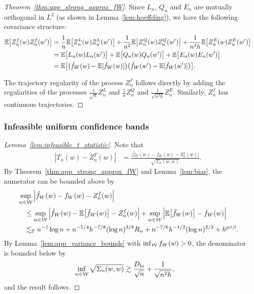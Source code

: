 \begin{proof}[Theorem~\ref{thm:app_strong_approx_fW}]
  Since $L_n$, $Q_n$ and $E_n$
  are mutually orthogonal in $L^2$
  (as shown in Lemma~\ref{lem:hoeffding}),
  we have the following covariance
  structure:
  \begin{align*}
    \mathbb{E}\big[Z_n^f(w) Z_n^f(w')\big]
    &=
    \frac{1}{n} \mathbb{E}\big[ Z_n^L(w) Z_n^L(w') \big]
    + \frac{1}{n^2} \mathbb{E}\big[ Z_n^Q(w) Z_n^Q(w') \big]
    + \frac{1}{n^2h} \mathbb{E}\big[ Z_n^E(w) Z_n^E(w') \big] \\
    &=
    \mathbb{E}\big[ L_n(w) L_n(w') \big]
    + \mathbb{E}\big[ Q_n(w) Q_n(w') \big]
    + \mathbb{E}\big[ E_n(w) E_n(w') \big] \\
    &=
    \mathbb{E}\big[
      \big(\hat f_W(w) - \mathbb{E}[\hat f_W(w)]\big)
      \big(\hat f_W(w') - \mathbb{E}[\hat f_W(w')]\big)
    \big].
  \end{align*}


  The trajectory regularity of the process
  $Z_n^f$ follows directly
  by adding the regularities
  of the processes $\frac{1}{\sqrt n} Z_n^L$
  and
  $\frac{1}{n} Z_n^Q$
  and
  $\frac{1}{\sqrt{n^2h}} Z_n^E$.
  Similarly, $Z_n^f$ has continuous trajectories.
\end{proof}

\subsubsection{Infeasible uniform confidence bands}

\begin{proof}[Lemma~\ref{lem:infeasible_t_statistic}]

  Note that
  \begin{align*}
    \left| T_n(w) - Z_n^T(w) \right|
    &= \frac{\big| \hat f_W(w) - f_W(w) - Z_n^f(w) \big|}
    {\sqrt{\Sigma_n(w,w)}}.
  \end{align*}
  By Theorem~\ref{thm:app_strong_approx_fW}
  and Lemma~\ref{lem:bias},
  the numerator can be bounded above by
  \begin{align*}
    &\sup_{w \in \mathcal{W}}
    \left|
    \hat f_W(w) - f_W(w)
    -
    Z_n^f(w)
    \right| \\
    &\quad\leq
    \sup_{w \in \mathcal{W}}
    \left|
    \hat f_W(w)
    - \mathbb{E}\big[\hat f_W(w)\big]
    -
    Z_n^f(w)
    \right|
    + \sup_{w \in \mathcal{W}}
    \left|
    \mathbb{E}\big[\hat f_W(w)\big]
    - f_W(w)
    \right| \\
    &\quad\lesssim_{\mathbb{P}}
    n^{-1} \log n
    + n^{-5/4} h^{-7/8} (\log n)^{3/8} R_n
    + n^{-7/6} h^{-1/2} (\log n)^{2/3}
    + h^{p \wedge \beta}.
  \end{align*}
  By Lemma~\ref{lem:app_variance_bounds}
  with $\inf_{\mathcal{W}} f_W(w) > 0$,
  the denominator is bounded below by
  \begin{align*}
    \inf_{w \in \mathcal{W}}
    \sqrt{\Sigma_n(w,w)}
    &\gtrsim
    \frac{D_{\textup{lo}}}{\sqrt n} + \frac{1}{\sqrt{n^2h}},
  \end{align*}
  and the result follows.
\end{proof}

